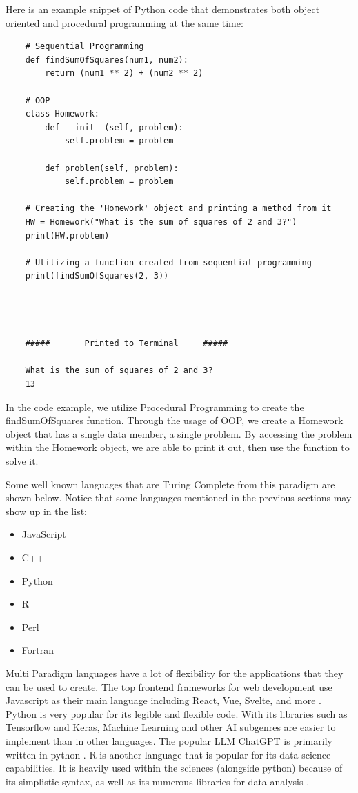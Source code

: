 Here is an example snippet of Python code that demonstrates both object oriented and procedural programming at the same time:

\begin{verbatim}
    # Sequential Programming
    def findSumOfSquares(num1, num2):
        return (num1 ** 2) + (num2 ** 2)

    # OOP
    class Homework:
        def __init__(self, problem):
            self.problem = problem
            
        def problem(self, problem):
            self.problem = problem

    # Creating the 'Homework' object and printing a method from it
    HW = Homework("What is the sum of squares of 2 and 3?")
    print(HW.problem)

    # Utilizing a function created from sequential programming
    print(findSumOfSquares(2, 3))




    #####       Printed to Terminal     #####

    What is the sum of squares of 2 and 3?
    13
\end{verbatim}

In the code example, we utilize Procedural Programming to create the findSumOfSquares function.
Through the usage of OOP, we create a Homework object that has a single data member, a single problem.
By accessing the problem within the Homework object, we are able to print it out, then use the function to solve it.

Some well known languages that are Turing Complete from this paradigm are shown below.
Notice that some languages mentioned in the previous sections may show up in the list: 
\begin{itemize}
    \item JavaScript
    \item C++
    \item Python
    \item R
    \item Perl
    \item Fortran
\end{itemize}

Multi Paradigm languages have a lot of flexibility for the applications that they can be used to create.
The top frontend frameworks for web development use Javascript as their main language including React, Vue, Svelte, and more \cite{JSPopular}.
Python is very popular for its legible and flexible code.
With its libraries such as Tensorflow and Keras, Machine Learning and other AI subgenres are easier to implement than in other languages.
The popular LLM ChatGPT is primarily written in python \cite{ChatGPTPython}.
R is another language that is popular for its data science capabilities.
It is heavily used within the sciences (alongside python) because of its simplistic syntax, as well as its numerous libraries for data analysis \cite{RDataSci,DataSciLangs}.

